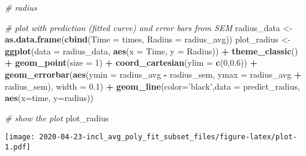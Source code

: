 \documentclass[]{article}
\newenvironment{Shaded}{\begin{snugshade}}{\end{snugshade}}
\newcommand{\CommentTok}[1]{\textcolor[rgb]{0.56,0.35,0.01}{\textit{#1}}}
\newcommand{\DataTypeTok}[1]{\textcolor[rgb]{0.13,0.29,0.53}{#1}}
\newcommand{\DecValTok}[1]{\textcolor[rgb]{0.00,0.00,0.81}{#1}}
\newcommand{\FloatTok}[1]{\textcolor[rgb]{0.00,0.00,0.81}{#1}}
\newcommand{\KeywordTok}[1]{\textcolor[rgb]{0.13,0.29,0.53}{\textbf{#1}}}
\newcommand{\NormalTok}[1]{#1}
\newcommand{\OperatorTok}[1]{\textcolor[rgb]{0.81,0.36,0.00}{\textbf{#1}}}
\newcommand{\StringTok}[1]{\textcolor[rgb]{0.31,0.60,0.02}{#1}}
\begin{document}
\begin{Shaded}
\begin{Highlighting}[]
\CommentTok{# radius }

\CommentTok{# plot with prediction (fitted curve) and error bars from SEM}
\NormalTok{radius_data <-}\StringTok{ }\KeywordTok{as.data.frame}\NormalTok{(}\KeywordTok{cbind}\NormalTok{(}\DataTypeTok{Time =}\NormalTok{ times, }\DataTypeTok{Radius =}\NormalTok{ radius_avg))}
\NormalTok{plot_radius <-}\StringTok{ }\KeywordTok{ggplot}\NormalTok{(}\DataTypeTok{data =}\NormalTok{ radius_data, }\KeywordTok{aes}\NormalTok{(}\DataTypeTok{x =}\NormalTok{ Time, }\DataTypeTok{y =}\NormalTok{ Radius)) }\OperatorTok{+}
\StringTok{  }\KeywordTok{theme_classic}\NormalTok{() }\OperatorTok{+}
\StringTok{  }\KeywordTok{geom_point}\NormalTok{(}\DataTypeTok{size =} \DecValTok{1}\NormalTok{) }\OperatorTok{+}
\StringTok{  }\KeywordTok{coord_cartesian}\NormalTok{(}\DataTypeTok{ylim =} \KeywordTok{c}\NormalTok{(}\DecValTok{0}\NormalTok{,}\FloatTok{0.6}\NormalTok{)) }\OperatorTok{+}
\StringTok{  }\KeywordTok{geom_errorbar}\NormalTok{(}\KeywordTok{aes}\NormalTok{(}\DataTypeTok{ymin =}\NormalTok{ radius_avg }\OperatorTok{-}\StringTok{ }\NormalTok{radius_sem, }\DataTypeTok{ymax =}\NormalTok{ radius_avg }\OperatorTok{+}\StringTok{ }\NormalTok{radius_sem),}
                \DataTypeTok{width =} \FloatTok{0.1}\NormalTok{) }\OperatorTok{+}
\StringTok{  }\KeywordTok{geom_line}\NormalTok{(}\DataTypeTok{color=}\StringTok{'black'}\NormalTok{,}\DataTypeTok{data =}\NormalTok{ predict_radius, }\KeywordTok{aes}\NormalTok{(}\DataTypeTok{x=}\NormalTok{time, }\DataTypeTok{y=}\NormalTok{radius))}

\CommentTok{# show the plot }
\NormalTok{plot_radius}
\end{Highlighting}
\end{Shaded}

\texttt{[image: 2020-04-23-incl\_avg\_poly\_fit\_subset\_files/figure-latex/plot-1.pdf]}
\end{document}
